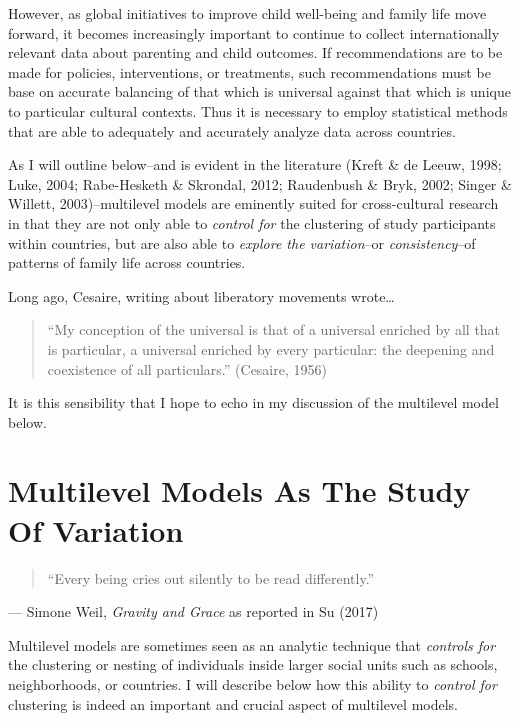 \documentclass[
  letterpaper,
  DIV=11,
  numbers=noendperiod]{scrreprt}
\begin{document}
However, as global initiatives to improve child well-being and family
life move forward, it becomes increasingly important to continue to
collect internationally relevant data about parenting and child
outcomes. If recommendations are to be made for policies, interventions,
or treatments, such recommendations must be base on accurate balancing
of that which is universal against that which is unique to particular
cultural contexts. Thus it is necessary to employ statistical methods
that are able to adequately and accurately analyze data across
countries.

As I will outline below--and is evident in the literature (Kreft \& de
Leeuw, 1998; Luke, 2004; Rabe-Hesketh \& Skrondal, 2012; Raudenbush \&
Bryk, 2002; Singer \& Willett, 2003)--multilevel models are eminently
suited for cross-cultural research in that they are not only able to
\emph{control for} the clustering of study participants within
countries, but are also able to \emph{explore the variation}--or
\emph{consistency}--of patterns of family life across countries.

Long ago, Cesaire, writing about liberatory movements wrote\ldots{}

\begin{quote}
``My conception of the universal is that of a universal enriched by all
that is particular, a universal enriched by every particular: the
deepening and coexistence of all particulars.'' (Cesaire, 1956)
\end{quote}

It is this sensibility that I hope to echo in my discussion of the
multilevel model below.

\hypertarget{sec-studyvariation}{%
\section{Multilevel Models As The Study Of
Variation}\label{sec-studyvariation}}

\begin{quote}
``Every being cries out silently to be read differently.''
\end{quote}

--- Simone Weil, \emph{Gravity and Grace} as reported in Su (2017)

Multilevel models are sometimes seen as an analytic technique that
\emph{controls for} the clustering or nesting of individuals inside
larger social units such as schools, neighborhoods, or countries. I will
describe below how this ability to \emph{control for} clustering is
indeed an important and crucial aspect of multilevel models.
\end{document}
